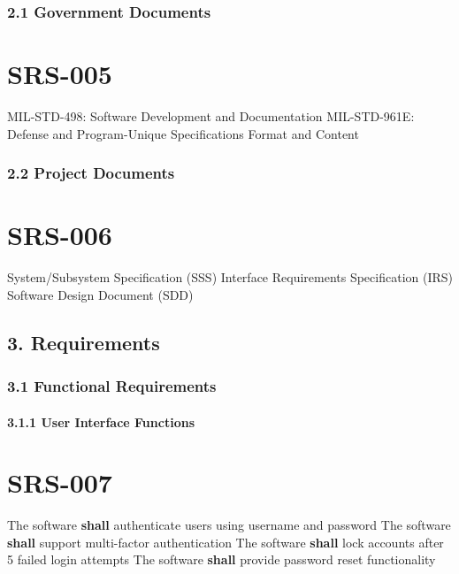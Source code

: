\subsubsection{2.1 Government Documents}

\section{SRS-005}\label{SRS-005}

MIL-STD-498: Software Development and Documentation
MIL-STD-961E: Defense and Program-Unique Specifications Format and Content\\

\subsubsection{2.2 Project Documents}

\section{SRS-006}\label{SRS-006}

System/Subsystem Specification (SSS)
Interface Requirements Specification (IRS)
Software Design Document (SDD)\\

\subsection{3. Requirements}

\subsubsection{3.1 Functional Requirements}

\paragraph{3.1.1 User Interface Functions}

\section{SRS-007}\label{SRS-007}

The software \textbf{shall} authenticate users using username and password
The software \textbf{shall} support multi-factor authentication
The software \textbf{shall} lock accounts after 5 failed login attempts
The software \textbf{shall} provide password reset functionality

